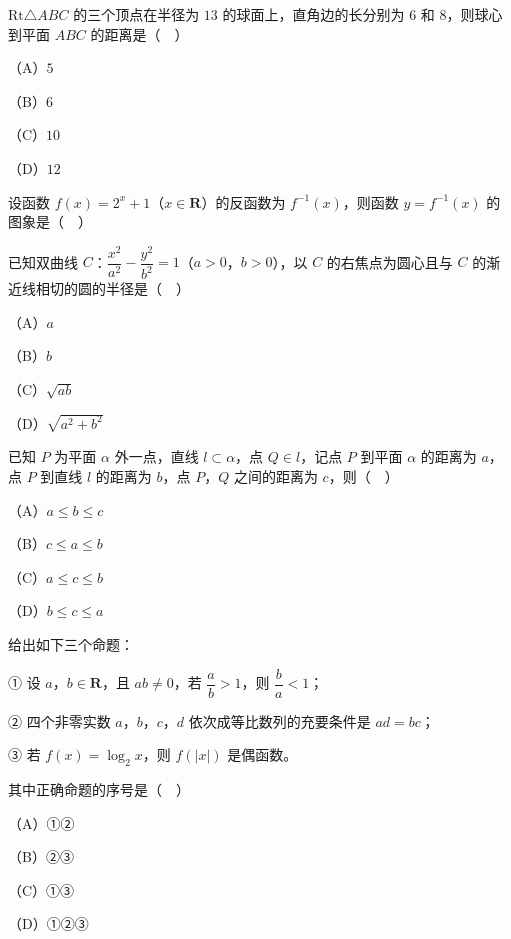 \begin{question}
$\mathrm{Rt}\triangle ABC$ 的三个顶点在半径为 $13$ 的球面上，直角边的长分别为 $6$ 和 $8$，则球心到平面 $ABC$ 的距离是（　）

（A）$5$

（B）$6$

（C）$10$

（D）$12$

\Needspace{0.4\textheight}
\end{question}
\begin{question}
设函数 $f(x)=2^x+1$（$x\in\mathbf R$）的反函数为 $f^{-1}(x)$，则函数 $y=f^{-1}(x)$ 的图象是（　）
\nopagebreak[4]
\begin{center}\end{center}
\nopagebreak[4]
\end{question}
\begin{question}
已知双曲线 $C$：$\dfrac{x^2}{a^2}-\dfrac{y^2}{b^2}=1$（$a>0$，$b>0$），以 $C$ 的右焦点为圆心且与 $C$ 的渐近线相切的圆的半径是（　）

（A）$a$

（B）$b$

（C）$\sqrt{ab}$

（D）$\sqrt{a^2+b^2}$

\end{question}
\begin{question}
已知 $P$ 为平面 $\alpha$ 外一点，直线 $l\subset\alpha$，点 $Q\in l$，记点 $P$ 到平面 $\alpha$ 的距离为 $a$，点 $P$ 到直线 $l$ 的距离为 $b$，点 $P$，$Q$ 之间的距离为 $c$，则（　）

（A）$a\leqslant b\leqslant c$

（B）$c\leqslant a\leqslant b$

（C）$a\leqslant c\leqslant b$

（D）$b\leqslant c\leqslant a$

\end{question}
\begin{question}
给出如下三个命题：

① 设 $a$，$b\in\mathbf R$，且 $ab\neq0$，若 $\dfrac ab>1$，则 $\dfrac ba<1$；

② 四个非零实数 $a$，$b$，$c$，$d$ 依次成等比数列的充要条件是 $ad=bc$；

③ 若 $f(x)=\log_2x$，则 $f(|x|)$ 是偶函数。

其中正确命题的序号是（　）

（A）①②

（B）②③

（C）①③

（D）①②③

\end{question}
